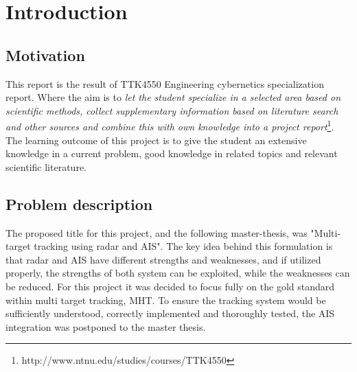 \section{Introduction}
\subsection{Motivation}
This report is the result of TTK4550 Engineering cybernetics specialization report. Where the aim is to \emph{let the student specialize in a selected area based on scientific methods, collect supplementary information based on literature search and other sources and combine this with own knowledge into a project report}\footnote{http://www.ntnu.edu/studies/courses/TTK4550}. The learning outcome of this project is to give the student an extensive knowledge in a current problem, good knowledge in related topics and relevant scientific literature.





\subsection{Problem description}
The proposed title for this project, and the following master-thesis, was "Multi-target tracking using radar and AIS". The key idea behind this formulation is that radar and AIS have different strengths and weaknesses, and if utilized properly, the strengths of both system can be exploited, while the weaknesses can be reduced. For this project it was decided to focus fully on the gold standard within multi target tracking, MHT. To ensure the tracking system would be sufficiently understood, correctly implemented and thoroughly tested, the AIS integration was postponed to the master thesis.

